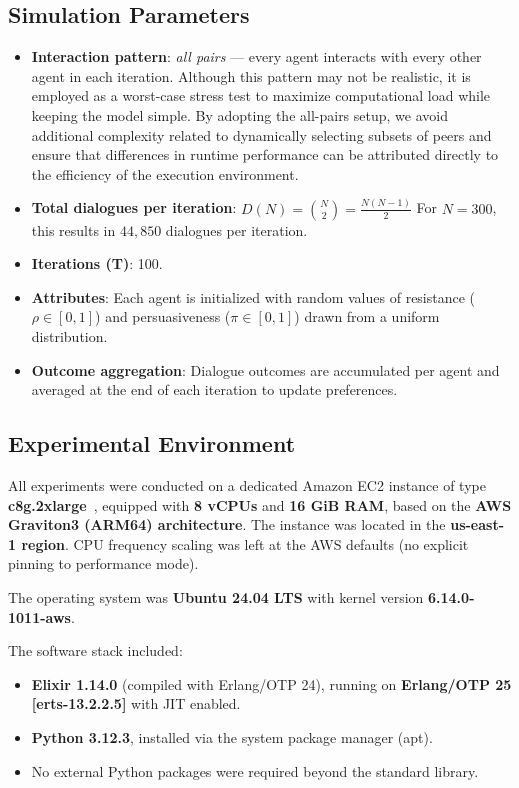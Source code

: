 \documentclass[
]{ceurart}
\begin{document}
\subsection{Simulation Parameters}
\begin{itemize}
	\item \textbf{Interaction pattern}: \emph{all pairs} — every agent interacts with every other agent in each iteration. Although this pattern may not be realistic, it is employed as a worst-case stress test to maximize computational load while keeping the model simple. By adopting the all-pairs setup, we avoid additional complexity related to dynamically selecting subsets of peers and ensure that differences in runtime performance can be attributed directly to the efficiency of the execution environment.

	\item \textbf{Total dialogues per iteration}:
$D(N) = \binom{N}{2} = \frac{N(N-1)}{2}$
For $N = 300$, this results in $44{,}850$ dialogues per iteration.
	\item \textbf{Iterations (T)}: 100.
	\item \textbf{Attributes}: Each agent is initialized with random values of resistance ($\rho \in [0,1]$) and persuasiveness ($\pi \in [0,1]$) drawn from a uniform distribution.
	\item \textbf{Outcome aggregation}: Dialogue outcomes are accumulated per agent and averaged at the end of each iteration to update preferences.
\end{itemize}


\subsection{Experimental Environment}
All experiments were conducted on a dedicated Amazon EC2 instance of type \textbf{c8g.2xlarge}~\cite{AwsInstanceTypes2025}, equipped with \textbf{8 vCPUs} and \textbf{16 GiB RAM}, based on the \textbf{AWS Graviton3 (ARM64) architecture}. The instance was located in the \textbf{us-east-1 region}. CPU frequency scaling was left at the AWS defaults (no explicit pinning to performance mode).

The operating system was \textbf{Ubuntu 24.04 LTS} with kernel version \textbf{6.14.0-1011-aws}.%

The software stack included:
\begin{itemize}
    \item \textbf{Elixir 1.14.0} (compiled with Erlang/OTP 24), running on \textbf{Erlang/OTP 25 [erts-13.2.2.5]} with JIT enabled.
    \item \textbf{Python 3.12.3}, installed via the system package manager (apt).
    \item No external Python packages were required beyond the standard library.
\end{itemize}
\end{document}
